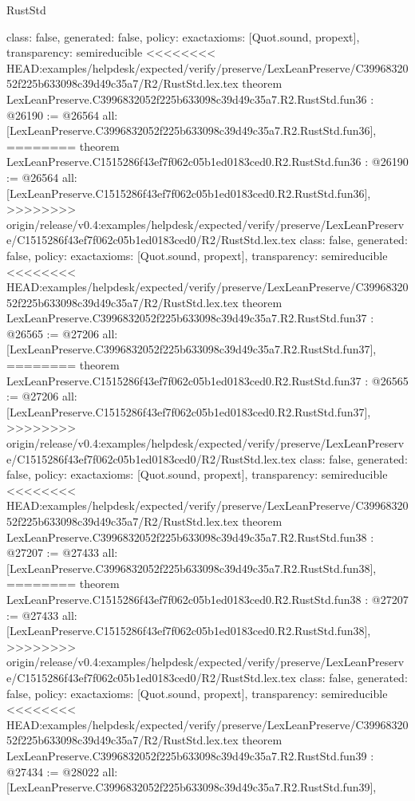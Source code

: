 \begin{lexlean}{RustStd}
\begin{coremodule}
{\begin{coremodule}
{{{{{{{{{{{{{{{{{{{{{{{{{{{{{{{{{{{{{{{  class: false,
  generated: false,
  policy: exact{axioms: [Quot.sound, propext]},
  transparency: semireducible
}
<<<<<<<< HEAD:examples/helpdesk/expected/verify/preserve/LexLeanPreserve/C3996832052f225b633098c39d49c35a7/R2/RustStd.lex.tex
theorem LexLeanPreserve.C3996832052f225b633098c39d49c35a7.R2.RustStd.fun36 : @26190 := @26564 {
  all: [LexLeanPreserve.C3996832052f225b633098c39d49c35a7.R2.RustStd.fun36],
========
theorem LexLeanPreserve.C1515286f43ef7f062c05b1ed0183ced0.R2.RustStd.fun36 : @26190 := @26564 {
  all: [LexLeanPreserve.C1515286f43ef7f062c05b1ed0183ced0.R2.RustStd.fun36],
>>>>>>>> origin/release/v0.4:examples/helpdesk/expected/verify/preserve/LexLeanPreserve/C1515286f43ef7f062c05b1ed0183ced0/R2/RustStd.lex.tex
  class: false,
  generated: false,
  policy: exact{axioms: [Quot.sound, propext]},
  transparency: semireducible
}
<<<<<<<< HEAD:examples/helpdesk/expected/verify/preserve/LexLeanPreserve/C3996832052f225b633098c39d49c35a7/R2/RustStd.lex.tex
theorem LexLeanPreserve.C3996832052f225b633098c39d49c35a7.R2.RustStd.fun37 : @26565 := @27206 {
  all: [LexLeanPreserve.C3996832052f225b633098c39d49c35a7.R2.RustStd.fun37],
========
theorem LexLeanPreserve.C1515286f43ef7f062c05b1ed0183ced0.R2.RustStd.fun37 : @26565 := @27206 {
  all: [LexLeanPreserve.C1515286f43ef7f062c05b1ed0183ced0.R2.RustStd.fun37],
>>>>>>>> origin/release/v0.4:examples/helpdesk/expected/verify/preserve/LexLeanPreserve/C1515286f43ef7f062c05b1ed0183ced0/R2/RustStd.lex.tex
  class: false,
  generated: false,
  policy: exact{axioms: [Quot.sound, propext]},
  transparency: semireducible
}
<<<<<<<< HEAD:examples/helpdesk/expected/verify/preserve/LexLeanPreserve/C3996832052f225b633098c39d49c35a7/R2/RustStd.lex.tex
theorem LexLeanPreserve.C3996832052f225b633098c39d49c35a7.R2.RustStd.fun38 : @27207 := @27433 {
  all: [LexLeanPreserve.C3996832052f225b633098c39d49c35a7.R2.RustStd.fun38],
========
theorem LexLeanPreserve.C1515286f43ef7f062c05b1ed0183ced0.R2.RustStd.fun38 : @27207 := @27433 {
  all: [LexLeanPreserve.C1515286f43ef7f062c05b1ed0183ced0.R2.RustStd.fun38],
>>>>>>>> origin/release/v0.4:examples/helpdesk/expected/verify/preserve/LexLeanPreserve/C1515286f43ef7f062c05b1ed0183ced0/R2/RustStd.lex.tex
  class: false,
  generated: false,
  policy: exact{axioms: [Quot.sound, propext]},
  transparency: semireducible
}
<<<<<<<< HEAD:examples/helpdesk/expected/verify/preserve/LexLeanPreserve/C3996832052f225b633098c39d49c35a7/R2/RustStd.lex.tex
theorem LexLeanPreserve.C3996832052f225b633098c39d49c35a7.R2.RustStd.fun39 : @27434 := @28022 {
  all: [LexLeanPreserve.C3996832052f225b633098c39d49c35a7.R2.RustStd.fun39],
}}}}}}}}}}}}}}}}}}}}}}}}}}}}}}}}}}}}}}}}}}
\end{coremodule}}
\end{coremodule}
\end{lexlean}
